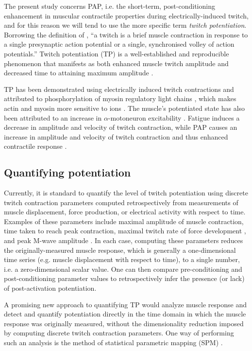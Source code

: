 \documentclass[utf8]{FrontiersinHarvard}
\begin{document}
The present study concerns PAP, i.e. the short-term, post-conditioning enhancement in muscular contractile properties during electrically-induced twitch, and for this reason we will tend to use the more specific term \textit{twitch potentiation}.
Borrowing the definition of \cite{hodgson},
``a twitch is a brief muscle contraction in response to a single presynaptic action potential or a single, synchronised volley of action potentials.''
Twitch potentiation (TP) is a well-established and reproducible phenomenon that manifests as both enhanced muscle twitch amplitude \citep{gossen, hamada, vandervoort} and decreased time to attaining maximum amplitude \citep{sasaki, sale, grange}.

TP has been demonstrated using electrically induced twitch contractions and attributed to phosphorylation of myosin regulatory light chains \citep{grange}, which makes actin and myosin more sensitive to  ions \citep{hodgson}.
The muscle's potentiated state has also been attributed to an increase in $ \alpha $-motoneuron excitability \citep{mccann}.
Fatigue induces a decrease in amplitude and velocity of twitch contraction, while PAP causes an increase in amplitude and velocity of twitch contraction and thus enhanced contractile response \citep{hodgson, rodriguez-falces, sasaki}.

\subsection{Quantifying potentiation}
Currently, it is standard to quantify the level of twitch potentiation using discrete twitch contraction parameters computed retrospectively from measurements of muscle displacement, force production, or electrical activity with respect to time.
Examples of these parameters include maximal amplitude of muscle contraction, time taken to reach peak contraction, maximal twitch rate of force development \citep{cochrane, kuu, wallace}, and peak M-wave amplitude \citep{rodriguez-falces}.
In each case, computing these parameters reduces the originally-measured muscle response, which is generally a one-dimensional time series (e.g. muscle displacement with respect to time), to a single number, i.e. a zero-dimensional scalar value.
One can then compare pre-conditioning and post-conditioning parameter values to retrospectively infer the presence (or lack) of post-activation potentiation.

A promising new approach to quantifying TP would analyze 
muscle response and detect and quantify potentiation directly in the time domain in which the muscle response was originally measured, without the dimensionality reduction imposed by computing discrete twitch contraction parameters.
One way of performing such an analysis is the method of statistical parametric mapping (SPM) \citep{friston, pataky-spm1d, pataky-roi, pataky}.
\end{document}
